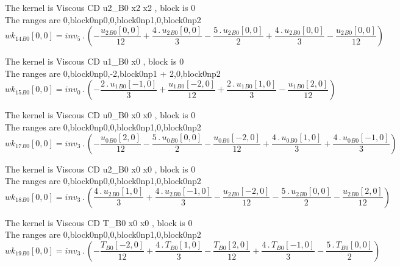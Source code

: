 \documentclass{article}
\begin{document}
\noindent The kernel is Viscous CD u2_B0 x2 x2 , block is 0\\\noindent The ranges are 0,block0np0,0,block0np1,0,block0np2\\\begin{dmath}{wk_{14}{_{B0}}}[{0,0}] = inv_5 \,.\, \left(- \frac{{u_{2}{_{B0}}}[{0,0}]}{12} + \frac{4 \,.\, {u_{2}{_{B0}}}[{0,0}]}{3} - \frac{5 \,.\, {u_{2}{_{B0}}}[{0,0}]}{2} + \frac{4 \,.\, {u_{2}{_{B0}}}[{0,0}]}{3} - 
\frac{{u_{2}{_{B0}}}[{0,0}]}{12}\right)\end{dmath}

\noindent The kernel is Viscous CD u1_B0 x0 , block is 0\\\noindent The ranges are 0,block0np0,-2,block0np1 + 2,0,block0np2\\\begin{dmath}{wk_{15}{_{B0}}}[{0,0}] = inv_0 \,.\, \left(- \frac{2 \,.\, {u_{1}{_{B0}}}[{-1,0}]}{3} + \frac{{u_{1}{_{B0}}}[{-2,0}]}{12} + \frac{2 \,.\, {u_{1}{_{B0}}}[{1,0}]}{3} - \frac{{u_{1}{_{B0}}}[{2,0}]}{12}\right)\end{dmath}

\noindent The kernel is Viscous CD u0_B0 x0 x0 , block is 0\\\noindent The ranges are 0,block0np0,0,block0np1,0,block0np2\\\begin{dmath}{wk_{17}{_{B0}}}[{0,0}] = inv_3 \,.\, \left(- \frac{{u_{0}{_{B0}}}[{2,0}]}{12} - \frac{5 \,.\, {u_{0}{_{B0}}}[{0,0}]}{2} - \frac{{u_{0}{_{B0}}}[{-2,0}]}{12} + \frac{4 \,.\, {u_{0}{_{B0}}}[{1,0}]}{3} + \frac{4 \,.\, 
{u_{0}{_{B0}}}[{-1,0}]}{3}\right)\end{dmath}

\noindent The kernel is Viscous CD u2_B0 x0 x0 , block is 0\\\noindent The ranges are 0,block0np0,0,block0np1,0,block0np2\\\begin{dmath}{wk_{18}{_{B0}}}[{0,0}] = inv_3 \,.\, \left(\frac{4 \,.\, {u_{2}{_{B0}}}[{1,0}]}{3} + \frac{4 \,.\, {u_{2}{_{B0}}}[{-1,0}]}{3} - \frac{{u_{2}{_{B0}}}[{-2,0}]}{12} - \frac{5 \,.\, {u_{2}{_{B0}}}[{0,0}]}{2} - 
\frac{{u_{2}{_{B0}}}[{2,0}]}{12}\right)\end{dmath}

\noindent The kernel is Viscous CD T_B0 x0 x0 , block is 0\\\noindent The ranges are 0,block0np0,0,block0np1,0,block0np2\\\begin{dmath}{wk_{19}{_{B0}}}[{0,0}] = inv_3 \,.\, \left(- \frac{{T{_{B0}}}[{-2,0}]}{12} + \frac{4 \,.\, {T{_{B0}}}[{1,0}]}{3} - \frac{{T{_{B0}}}[{2,0}]}{12} + \frac{4 \,.\, {T{_{B0}}}[{-1,0}]}{3} - \frac{5 \,.\, 
{T{_{B0}}}[{0,0}]}{2}\right)\end{dmath}
\end{document}
